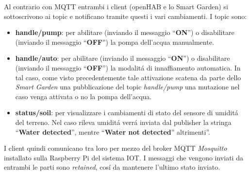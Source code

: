 Al contrario con MQTT entrambi i client (openHAB e lo Smart Garden) si sottoscrivono ai topic e notificano tramite questi i vari cambiamenti.
I topic sono:
\begin{itemize}
    \item \textbf{handle/pump}: per abilitare (inviando il messaggio ``\textbf{ON}'') o disabilitare (inviando il messaggio ``\textbf{OFF}'') la pompa dell'acqua manualmente.
    \item \textbf{handle/auto}: per abilitare (inviando il messaggio ``\textbf{ON}'') o disabilitare (inviando il messaggio ``\textbf{OFF}'') la modalit\'a di innaffiamento automatica. In tal caso, come visto precedentemente tale attivazione scatena da parte dello {\em Smart Garden} una pubblicazione del topic {\em handle/pump} una mutazione nel caso venga attivata o no la pompa dell'acqua.
    \item \textbf{status/soil}: per visualizzare i cambiamenti di stato del sensore di umidit\'a del terreno. Nel caso rileva umidit\'a verr\'a inviata dal publisher la stringa ``\textbf{Water detected}'', mentre ``\textbf{Water not detected}'' altrimenti''.
\end{itemize}

I client quindi comunicano tra loro per mezzo del broker MQTT {\em Mosquitto} installato sulla Raspberry Pi del sistema IOT. I messaggi che vengono inviati da entrambi le parti sono {\em retained}, cos\'i da mantenere l'ultimo stato inviato.


